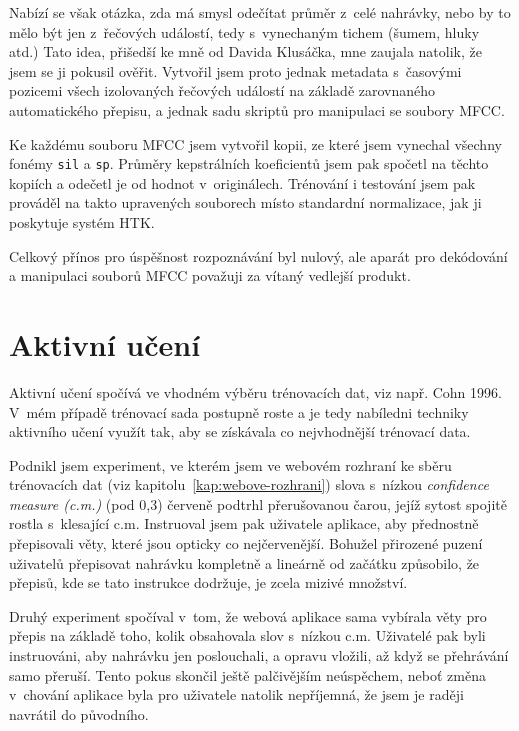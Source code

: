 Nabízí se však otázka, zda má smysl odečítat průměr z~celé nahrávky, nebo by to
mělo být jen z~řečových událostí, tedy s~vynechaným tichem (šumem, hluky atd.)
Tato idea, přišedší ke mně od Davida Klusáčka, mne zaujala natolik, že jsem se
ji pokusil ověřit. Vytvořil jsem proto jednak metadata s~časovými pozicemi všech
izolovaných řečových událostí na základě zarovnaného automatického přepisu, a jednak sadu skriptů
pro manipulaci se soubory MFCC.

Ke každému souboru MFCC jsem vytvořil kopii, ze které
jsem vynechal všechny fonémy \texttt{sil} a \texttt{sp}. Průměry kepstrálních
koeficientů jsem pak spočetl na těchto kopiích a odečetl je od hodnot
v~originálech. Trénování i testování jsem pak prováděl na takto upravených
souborech místo standardní normalizace, jak ji poskytuje systém HTK.

Celkový přínos pro úspěšnost rozpoznávání byl nulový, ale aparát pro dekódování
a manipulaci souborů MFCC považuji za vítaný vedlejší produkt.

\section{Aktivní učení}

Aktivní učení spočívá ve vhodném výběru trénovacích dat, viz např. Cohn
1996\cite{cohn1996active}. V~mém případě trénovací sada postupně roste a je tedy
nabíledni techniky aktivního učení využít tak, aby se získávala co nejvhodnější
trénovací data.

Podnikl jsem experiment, ve kterém jsem ve webovém rozhraní ke sběru trénovacích
dat (viz kapitolu~\ref{kap:webove-rozhrani}) slova s~nízkou {\em confidence
measure (c.m.)} (pod 0,3) červeně podtrhl přerušovanou čarou, jejíž sytost spojitě rostla
s~klesající c.m. Instruoval jsem pak uživatele aplikace, aby přednostně
přepisovali věty, které jsou opticky co nejčervenější. Bohužel přirozené puzení
uživatelů přepisovat nahrávku kompletně a lineárně od začátku způsobilo, že
přepisů, kde se tato instrukce dodržuje, je zcela mizivé množství.

Druhý experiment spočíval v~tom, že webová aplikace sama vybírala věty pro
přepis na základě toho, kolik obsahovala slov s~nízkou c.m. Uživatelé pak byli
instruováni, aby nahrávku jen poslouchali, a opravu vložili, až když se
přehrávání samo přeruší. Tento pokus skončil ještě palčivějším neúspěchem, neboť
změna v~chování aplikace byla pro uživatele natolik nepříjemná, že jsem je
raději navrátil do původního.

